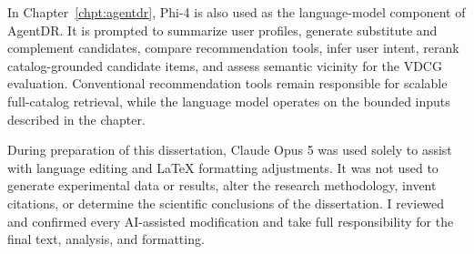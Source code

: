 In Chapter~\ref{chpt:agentdr}, Phi-4 is also used as the language-model component of AgentDR. It is prompted to summarize user profiles, generate substitute and complement candidates, compare recommendation tools, infer user intent, rerank catalog-grounded candidate items, and assess semantic vicinity for the VDCG evaluation. Conventional recommendation tools remain responsible for scalable full-catalog retrieval, while the language model operates on the bounded inputs described in the chapter.

During preparation of this dissertation, Claude Opus 5 was used solely to assist with language editing and LaTeX formatting adjustments. It was not used to generate experimental data or results, alter the research methodology, invent citations, or determine the scientific conclusions of the dissertation. I reviewed and confirmed every AI-assisted modification and take full responsibility for the final text, analysis, and formatting.
